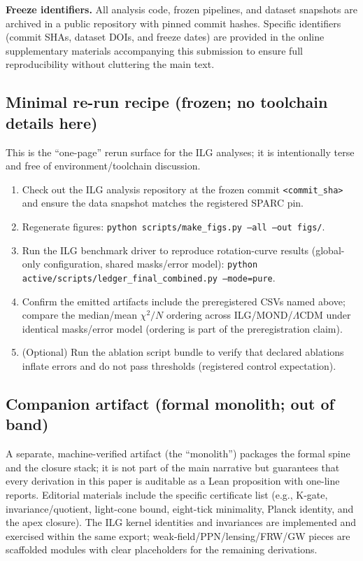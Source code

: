 \documentclass[11pt]{article}
\begin{document}
\medskip
\noindent\textbf{Freeze identifiers.}
All analysis code, frozen pipelines, and dataset snapshots are archived in a public repository with pinned commit hashes. Specific identifiers (commit SHAs, dataset DOIs, and freeze dates) are provided in the online supplementary materials accompanying this submission to ensure full reproducibility without cluttering the main text.

\subsection*{Minimal re-run recipe (frozen; no toolchain details here)}
This is the ``one-page'' rerun surface for the ILG analyses; it is intentionally terse and free of environment/toolchain discussion.

\begin{enumerate}
  \item Check out the ILG analysis repository at the frozen commit \texttt{<commit\_sha>} and ensure the data snapshot matches the registered SPARC pin.
  \item Regenerate figures: \texttt{python scripts/make\_figs.py --all --out figs/}. 
  \item Run the ILG benchmark driver to reproduce rotation-curve results (global-only configuration, shared masks/error model): \texttt{python active/scripts/ledger\_final\_combined.py --mode=pure}. 
  \item Confirm the emitted artifacts include the preregistered CSVs named above; compare the median/mean $\chi^2/N$ ordering across ILG/MOND/$\Lambda$CDM under identical masks/error model (ordering is part of the preregistration claim). 
  \item (Optional) Run the ablation script bundle to verify that declared ablations inflate errors and do not pass thresholds (registered control expectation). 
\end{enumerate}

\subsection*{Companion artifact (formal monolith; out of band)}
A separate, machine-verified artifact (the ``monolith'') packages the formal spine and the closure stack; it is not part of the main narrative but guarantees that every derivation in this paper is auditable as a Lean proposition with one-line reports. Editorial materials include the specific certificate list (e.g., K-gate, invariance/quotient, light-cone bound, eight-tick minimality, Planck identity, and the apex closure).  The ILG kernel identities and invariances are implemented and exercised within the same export; weak-field/PPN/lensing/FRW/GW pieces are scaffolded modules with clear placeholders for the remaining derivations.
\end{document}
